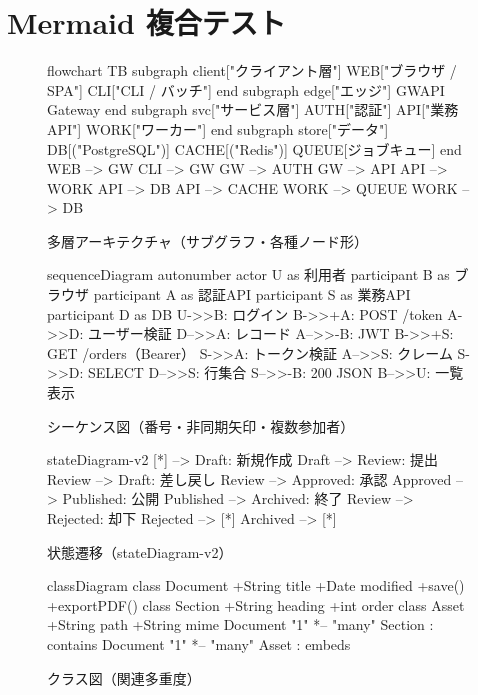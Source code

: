 \documentclass{article}
\begin{document}
\section*{Mermaid 複合テスト}

\begin{figure}[htbp]
\begin{mermaid}
flowchart TB
  subgraph client["クライアント層"]
    WEB["ブラウザ / SPA"]
    CLI["CLI / バッチ"]
  end
  subgraph edge["エッジ"]
    GW{{API Gateway}}
  end
  subgraph svc["サービス層"]
    AUTH["認証"]
    API["業務 API"]
    WORK["ワーカー"]
  end
  subgraph store["データ"]
    DB[("PostgreSQL")]
    CACHE[("Redis")]
    QUEUE[ジョブキュー]
  end
  WEB --> GW
  CLI --> GW
  GW --> AUTH
  GW --> API
  API --> WORK
  API --> DB
  API --> CACHE
  WORK --> QUEUE
  WORK --> DB
\end{mermaid}
\caption{多層アーキテクチャ（サブグラフ・各種ノード形）}
\end{figure}

\begin{figure}[htbp]
\begin{mermaid}
sequenceDiagram
  autonumber
  actor U as 利用者
  participant B as ブラウザ
  participant A as 認証API
  participant S as 業務API
  participant D as DB
  U->>B: ログイン
  B->>+A: POST /token
  A->>D: ユーザー検証
  D-->>A: レコード
  A-->>-B: JWT
  B->>+S: GET /orders（Bearer）
  S->>A: トークン検証
  A-->>S: クレーム
  S->>D: SELECT
  D-->>S: 行集合
  S-->>-B: 200 JSON
  B-->>U: 一覧表示
\end{mermaid}
\caption{シーケンス図（番号・非同期矢印・複数参加者）}
\end{figure}

\begin{figure}[htbp]
\begin{mermaid}
stateDiagram-v2
  [*] --> Draft: 新規作成
  Draft --> Review: 提出
  Review --> Draft: 差し戻し
  Review --> Approved: 承認
  Approved --> Published: 公開
  Published --> Archived: 終了
  Review --> Rejected: 却下
  Rejected --> [*]
  Archived --> [*]
\end{mermaid}
\caption{状態遷移（stateDiagram-v2）}
\end{figure}

\begin{figure}[htbp]
\begin{mermaid}
classDiagram
  class Document {
    +String title
    +Date modified
    +save()
    +exportPDF()
  }
  class Section {
    +String heading
    +int order
  }
  class Asset {
    +String path
    +String mime
  }
  Document "1" *-- "many" Section : contains
  Document "1" *-- "many" Asset : embeds
\end{mermaid}
\caption{クラス図（関連多重度）}
\end{figure}
\end{document}
